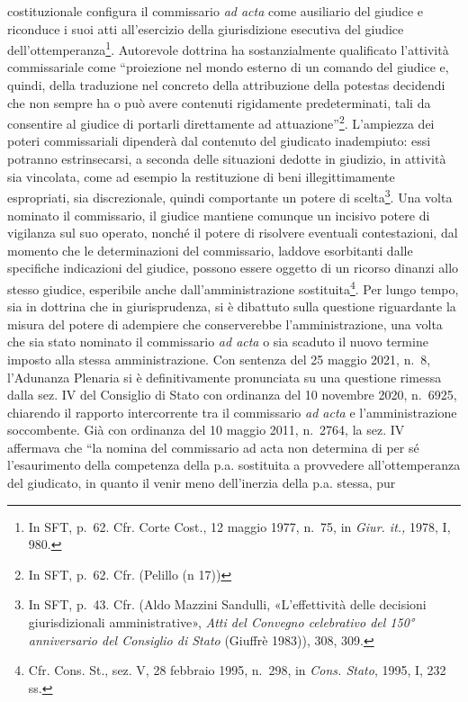 \documentclass[12pt,it,a4paper,]{report}
\begin{document}
costituzionale configura il commissario \emph{ad acta} come ausiliario
del giudice e riconduce i suoi atti all'esercizio della giurisdizione
esecutiva del giudice dell'ottemperanza\footnote{In SFT, p.~62. Cfr.
  Corte Cost., 12 maggio 1977, n.~75, in \emph{Giur. it.,} 1978, I, 980.}.
Autorevole dottrina ha sostanzialmente qualificato l'attività
commissariale come ``proiezione nel mondo esterno di un comando del
giudice e, quindi, della traduzione nel concreto della attribuzione
della potestas decidendi che non sempre ha o può avere contenuti
rigidamente predeterminati, tali da consentire al giudice di portarli
direttamente ad attuazione''\footnote{In SFT, p.~62. Cfr. (Pelillo (n
  17))}. L'ampiezza dei poteri commissariali dipenderà dal contenuto del
giudicato inadempiuto: essi potranno estrinsecarsi, a seconda delle
situazioni dedotte in giudizio, in attività sia vincolata, come ad
esempio la restituzione di beni illegittimamente espropriati, sia
discrezionale, quindi comportante un potere di scelta\footnote{In SFT,
  p.~43. Cfr. (Aldo Mazzini Sandulli, {«L'effettività delle decisioni
  giurisdizionali amministrative»}, \emph{Atti del Convegno celebrativo
  del 150° anniversario del Consiglio di Stato} (Giuffrè 1983)), 308,
  309.}. Una volta nominato il commissario, il giudice mantiene comunque
un incisivo potere di vigilanza sul suo operato, nonché il potere di
risolvere eventuali contestazioni, dal momento che le determinazioni del
commissario, laddove esorbitanti dalle specifiche indicazioni del
giudice, possono essere oggetto di un ricorso dinanzi allo stesso
giudice, esperibile anche dall'amministrazione sostituita\footnote{Cfr.
  Cons. St., sez. V, 28 febbraio 1995, n.~298, in \emph{Cons. Stato},
  1995, I, 232 ss.}. Per lungo tempo, sia in dottrina che in
giurisprudenza, si è dibattuto sulla questione riguardante la misura del
potere di adempiere che conserverebbe l'amministrazione, una volta che
sia stato nominato il commissario \emph{ad acta} o sia scaduto il nuovo
termine imposto alla stessa amministrazione. Con sentenza del 25 maggio
2021, n.~8, l'Adunanza Plenaria si è definitivamente pronunciata su una
questione rimessa dalla sez. IV del Consiglio di Stato con ordinanza del
10 novembre 2020, n.~6925, chiarendo il rapporto intercorrente tra il
commissario \emph{ad acta} e l'amministrazione soccombente. Già con
ordinanza del 10 maggio 2011, n.~2764, la sez. IV affermava che ``la
nomina del commissario ad acta non determina di per sé l'esaurimento
della competenza della p.a. sostituita a provvedere all'ottemperanza del
giudicato, in quanto il venir meno dell'inerzia della p.a. stessa, pur
\end{document}
